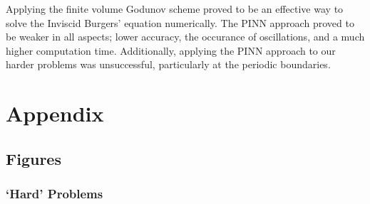 \documentclass{myproject}
\begin{document}
Applying the finite volume Godunov scheme proved to be an effective way to solve the Inviscid Burgers' equation numerically. The PINN approach proved to be weaker in all aspects; lower accuracy, the occurance of oscillations, and a much higher computation time. Additionally, applying the PINN approach to our harder problems was unsuccessful, particularly at the periodic boundaries.

\newpage
\appendix
\section{Appendix}
\subsection{Figures}

\subsubsection{`Hard' Problems}
\end{document}
